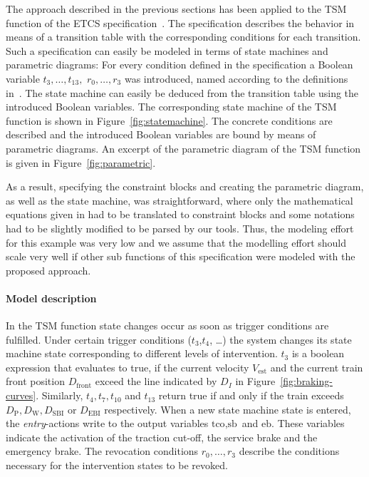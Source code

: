 The approach described in the previous sections has been applied to the TSM function of the ETCS specification~\cite{ETCSSRS-Principles}. The specification describes the behavior in means of a transition table with the corresponding conditions for each transition. Such a specification can easily be modeled in terms of state machines and parametric diagrams: 
For every condition defined in the specification a Boolean variable $t_3,\ldots,t_{13},$ $r_0,\ldots,r_3$ was introduced, named according to the definitions  in~\cite{ETCSSRS-Principles}. The state machine can easily be deduced from the transition table using the introduced Boolean variables. The corresponding state machine of the TSM function is shown in Figure~\ref{fig:statemachine}. The concrete conditions are described and the introduced Boolean variables are bound by means of parametric diagrams. An excerpt of the parametric diagram of the TSM function is given in Figure~\ref{fig:parametric}. 

As a result, specifying the constraint blocks and creating the parametric diagram, as well as the state machine, was straightforward, where only the mathematical equations given in \cite{ETCSSRS-Principles} had to be translated to
constraint blocks and some notations had to be slightly modified to be parsed by our tools. Thus, the 
modeling effort for this example was very low and we assume that the modelling effort should scale very well
if other sub functions of this specification were modeled with the proposed approach.  

\paragraph{Model description}
In the TSM function state changes occur as soon as trigger conditions are fulfilled.
Under certain trigger conditions ($t_3$,$t_4$, \ldots) the system changes
its state machine state corresponding to different levels of intervention.
$t_3$ is a boolean expression that evaluates to true, if the current velocity
$V_\text{est}$ and the current train front position $D_\text{front}$ exceed the
line indicated by $D_I$ in Figure~\ref{fig:braking-curves}. Similarly,
$t_4,t_7,t_{10}$ and $t_{13}$ return true if and only if the train
exceeds $D_\text{P},D_\text{W},D_\text{SBI}$ or $D_\text{EBI}$ respectively.
When a new state machine state is entered, the \emph{entry}-actions write to the output
variables $\text{tco},\text{sb}$ and $\text{eb}$. These variables indicate the
activation of the traction cut-off, the service brake and the emergency brake.
The revocation conditions $r_0,\ldots,r_3$ describe the conditions
necessary for the intervention states to be revoked.

